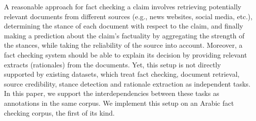 A reasonable approach for fact checking a claim involves retrieving potentially relevant documents from different sources (e.g., news websites, social media, etc.), determining the stance of each document with respect to the claim, and finally making a prediction about the claim's factuality by aggregating the strength of the stances, while taking the reliability of the source into account. Moreover, a fact checking system should be able to explain its decision by providing relevant extracts (rationales) from the documents. Yet, this setup is not directly supported by existing datasets, which treat fact checking, document retrieval, source credibility, stance detection and rationale extraction as independent tasks. In this paper, we support the interdependencies between these tasks as annotations in the same corpus. We implement this setup on an Arabic fact checking corpus, the first of its kind.
